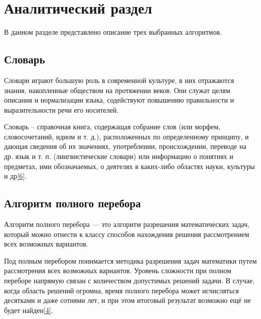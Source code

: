 \documentclass[14pt, a4paper]{extarticle}
\begin{document}
	\clearpage
	\section{Аналитический раздел}
	В данном разделе представлено описание трех выбранных алгоритмов.
	
	\subsection{Словарь}
	Словари играют большую роль в современной культуре, в них отражаются знания, накопленные обществом на протяжении веков. Они служат целям описания и нормализации языка, содействуют повышению правильности и выразительности речи его носителей.
	
	Словарь –  справочная книга, содержащая собрание слов (или морфем, словосочетаний, идиом и т. д.), расположенных по определенному принципу, и дающая сведения об их значениях, употреблении, происхождении, переводе на др. язык и т. п. (лингвистические словари) или информацию о понятиях и предметах, ими обозначаемых, о деятелях в каких-либо областях науки, культуры и др\hyperref[Litre]{[6]}.
	
	
	\subsection{Алгоритм полного перебора}
	Алгоритм полного перебора — это алгоритм разрешения математических задач, который можно отнести к классу способов нахождения решения рассмотрением всех возможных вариантов.\par
	Под полным перебором понимается методика разрешения задач математики путем рассмотрения всех возможных вариантов. Уровень сложности при полном переборе напрямую связан с количеством допустимых решений задачи. В случае, когда область решений огромна, время полного перебора может исчисляться десятками и даже сотнями лет, и при этом итоговый результат возможно ещё не будет найден\hyperref[Litre]{[4]}.

	
\end{document}
